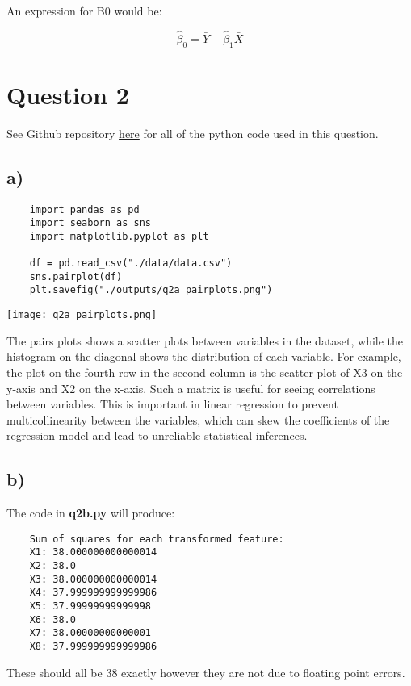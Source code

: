 \documentclass{article}
\begin{document}
An expression for B0 would be:

\begin{equation*}
	\hat{\beta}_{0} = \bar{Y} - \hat{\beta}_{1}\bar{X}
\end{equation*}

\newpage
\section*{Question 2}

See Github repository \href{https://github.com/william-coulter/COMP9417_Homework_1/tree/master/python}{here} for all of the python code used in this question.

\subsection*{a)}
\begin{verbatim}
	import pandas as pd
	import seaborn as sns
	import matplotlib.pyplot as plt
	
	df = pd.read_csv("./data/data.csv")
	sns.pairplot(df)
	plt.savefig("./outputs/q2a_pairplots.png")
\end{verbatim}
\texttt{[image: q2a\_pairplots.png]}

The pairs plots shows a scatter plots between variables in the dataset, while
the histogram on the diagonal shows the distribution of each variable. 
For example, the plot on the fourth row in the second column is the scatter plot of X3
on the y-axis and X2 on the x-axis. Such a matrix is useful for seeing correlations between 
variables. This is important in linear regression to prevent multicollinearity between the 
variables, which can skew the coefficients of the regression model and lead to unreliable
statistical inferences.

\newpage
\subsection*{b)}

The code in \textbf{q2b.py} will produce:

\begin{verbatim}
	Sum of squares for each transformed feature:
	X1: 38.000000000000014
	X2: 38.0
	X3: 38.000000000000014
	X4: 37.999999999999986
	X5: 37.99999999999998
	X6: 38.0
	X7: 38.00000000000001
	X8: 37.999999999999986
\end{verbatim}

These should all be 38 exactly however they are not due to floating point errors.
\end{document}
